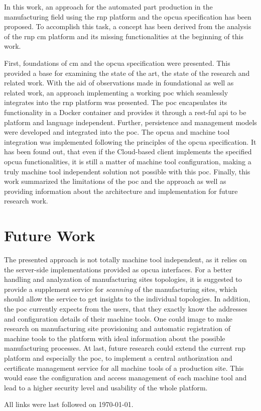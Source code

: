 \documentclass[
a4paper,
twoside,
headsepline,
cleardoublepage=empty,
parskip=half,
draft=false
]{scrbook}
\begin{document}
			In this work, an approach for the automated part production in the manufacturing field using the \gls{rnp} platform and the \gls{opcua} specification has been proposed. To accomplish this task, a concept has been derived from the analysis of the \gls{rnp} \gls{cm} platform and its missing functionalities at the beginning of this work.

			First, foundations of \gls{cm} and the \gls{opcua} specification were presented. This provided a base for examining the state of the art, the state of the research and related work.
			With the aid of observations made in foundational as well as related work, an approach implementing a working \gls{poc} which seamlessly integrates into the \gls{rnp} platform was presented. 
			The \gls{poc} encapsulates its functionality in a Docker container and provides it through a \gls{rest}-ful \gls{api} to be platform and language independent. 
			Further, persistence and management models were developed and integrated into the \gls{poc}. 
			The \gls{opcua} and machine tool integration was implemented following the principles of the \gls{opcua} specification.
			It has been found out, that even if the Cloud-based client implements the specified \gls{opcua} functionalities, it is still a matter of machine tool configuration, making a truly machine tool independent solution not possible with this \gls{poc}. Finally, this work summarized the limitations of the \gls{poc} and the approach as well as providing information about the architecture and implementation for future research work.

		\section{Future Work}\label{sec:future_work}

			The presented approach is not totally machine tool independent, as it relies on the server-side implementations provided as \gls{opcua} interfaces. 
			For a better handling and analyzation of manufacturing sites topologies, it is suggested to provide a supplement service for \textit{scanning} of the manufacturing sites, which should allow the service to get insights to the individual topologies.
			In addition, the \gls{poc} currently expects from the users, that they exactly know the addresses and configuration details of their machine tools. One could image to make research on manufacturing site provisioning and automatic registration of machine tools to the platform with ideal information about the possible manufacturing processes.
			At last, future research could extend the current \gls{rnp} platform and especially the \gls{poc}, to implement a central authorization and certificate management service for all machine tools of a production site. 
			This would ease the configuration and access management of each machine tool and lead to a higher security level and usability of the whole platform.

	\clearpage


	\printbibliography

	All links were last followed on \today.

	\pagestyle{empty}
	\renewcommand*{\chapterpagestyle}{empty}
	\Versicherung
\end{document}
